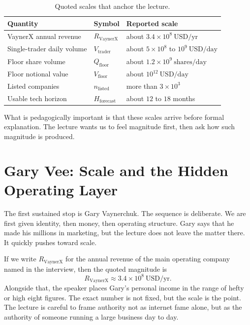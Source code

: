 \begin{table}[h]
\centering
\begin{tabular}{|l|l|l|}
\hline
Quantity & Symbol & Reported scale \\
\hline
VaynerX annual revenue & $R_{\mathrm{VaynerX}}$ & about $3.4\times 10^8\ \mathrm{USD/yr}$ \\
Single-trader daily volume & $V_{\mathrm{trader}}$ & about $5\times 10^8$ to $10^9\ \mathrm{USD/day}$ \\
Floor share volume & $Q_{\mathrm{floor}}$ & about $1.2\times 10^9\ \mathrm{shares/day}$ \\
Floor notional value & $V_{\mathrm{floor}}$ & about $10^{12}\ \mathrm{USD/day}$ \\
Listed companies & $n_{\mathrm{listed}}$ & more than $3\times 10^3$ \\
Usable tech horizon & $H_{\mathrm{forecast}}$ & about $12$ to $18$ months \\
\hline
\end{tabular}
\caption{Quoted scales that anchor the lecture.}
\end{table}

What is pedagogically important is that these scales arrive before formal explanation. The lecture wants us to feel magnitude first, then ask how such magnitude is produced.

\section{Gary Vee: Scale and the Hidden Operating Layer}

The first sustained stop is Gary Vaynerchuk. The sequence is deliberate. We are first given identity, then money, then operating structure. Gary says that he made his millions in marketing, but the lecture does not leave the matter there. It quickly pushes toward scale.

If we write $R_{\mathrm{VaynerX}}$ for the annual revenue of the main operating company named in the interview, then the quoted magnitude is
\begin{equation}
R_{\mathrm{VaynerX}} \approx 3.4\times 10^8\ \mathrm{USD/yr}.
\end{equation}
Alongside that, the speaker places Gary's personal income in the range of hefty or high eight figures. The exact number is not fixed, but the scale is the point. The lecture is careful to frame authority not as internet fame alone, but as the authority of someone running a large business day to day.

